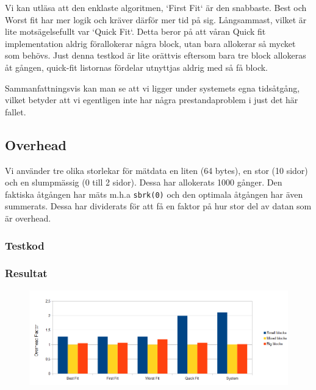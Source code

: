 \documentclass[a4paper,10pt,titlepage]{article}
\begin{document}
Vi kan utläsa att den enklaste algoritmen, `First Fit` är den snabbaste. Best och Worst fit har mer logik och kräver därför mer tid på sig. Långsammast, vilket är lite motsägelsefullt var `Quick Fit`. Detta beror på att våran Quick fit implementation aldrig förallokerar några block, utan bara allokerar så mycket som behövs. Just denna testkod är lite orättvis eftersom bara tre block allokeras åt gången, quick-fit listornas fördelar utnyttjas aldrig med så få block.


Sammanfattningsvis kan man se att vi ligger under systemets egna tidsåtgång, vilket betyder att vi egentligen inte har några prestandaproblem i just det här fallet.

\subsection{Overhead}

Vi använder tre olika storlekar för mätdata en liten (64 bytes), en stor (10 sidor) och en slumpmässig (0 till 2 sidor). Dessa har allokerats 1000 gånger. Den faktiska åtgången har mäts m.h.a \texttt{sbrk(0)} och den optimala åtgången har även summerats. Dessa har dividerats för att få en faktor på hur stor del av datan som är overhead.

\subsubsection{Testkod}

\scriptsize{}
\normalsize

\subsubsection{Resultat}

\begin{figure}[H]
	\includegraphics[width=\textwidth]{overhead.png}
\end{figure}
\end{document}

